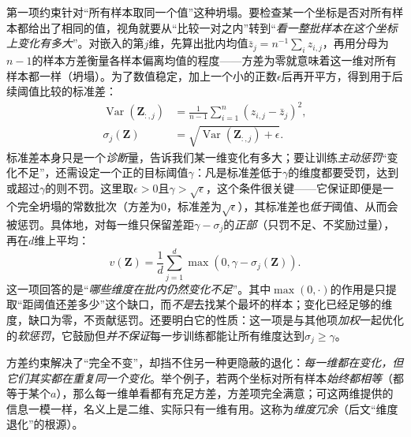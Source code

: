 第一项约束针对“所有样本取同一个值”这种坍塌。要检查某一个坐标是否对所有样本都给出了相同的值，视角就要从“比较一对之内”转到“\emph{看一整批样本在这个坐标上变化有多大}”。对嵌入的第$j$维，先算出批内均值$\bar z_j=n^{-1}\sum_i z_{i,j}$，再用分母为$n-1$的样本方差衡量各样本偏离均值的程度——方差为零就意味着这一维对所有样本都一样（坍塌）。为了数值稳定，加上一个小的正数$\epsilon$后再开平方，得到用于后续阈值比较的标准差：
\[
  \begin{aligned}
    \operatorname{Var}(\bm{Z}_{:,j})
    &=\frac{1}{n-1}\sum_{i=1}^{n}(z_{i,j}-\bar z_j)^2,\\
    \sigma_j(\bm{Z})
    &=\sqrt{\operatorname{Var}(\bm{Z}_{:,j})+\epsilon}.
  \end{aligned}
\]
标准差本身只是一个\emph{诊断}量，告诉我们某一维变化有多大；要让训练\emph{主动惩罚}“变化不足”，还需设定一个正的目标阈值$\gamma$：凡是标准差低于$\gamma$的维度都要受罚，达到或超过$\gamma$的则不罚。这里取$\epsilon>0$且$\gamma>\sqrt{\epsilon}$，这个条件很关键——它保证即便是一个完全坍塌的常数批次（方差为0，标准差为$\sqrt{\epsilon}$），其标准差也\emph{低于}阈值、从而会被惩罚。具体地，对每一维只保留差距$\gamma-\sigma_j$的\emph{正部}（只罚不足、不奖励过量），再在$d$维上平均：
\begin{equation}
  v(\bm{Z})
  =\frac{1}{d}\sum_{j=1}^{d}\max(0,\gamma-\sigma_j(\bm{Z})).
  \label{eq:data-derived-knowledge-vicreg-variance}
\end{equation}
这一项回答的是“\emph{哪些维度在批内仍然变化不足}”。其中$\max(0,\cdot)$的作用是只提取“距阈值还差多少”这个缺口，而\emph{不是}去找某个最坏的样本；变化已经足够的维度，缺口为零，不贡献惩罚。还要明白它的性质：这一项是与其他项\emph{加权}一起优化的\emph{软惩罚}，它鼓励但\emph{并不保证}每一步训练都能让所有维度达到$\sigma_j\geq\gamma$。

方差约束解决了“完全不变”，却挡不住另一种更隐蔽的退化：\emph{每一维都在变化，但它们其实都在重复同一个变化}。举个例子，若两个坐标对所有样本\emph{始终都相等}（都等于某个$a$），那么每一维单看都有充足方差，方差项完全满意；可这两维提供的信息一模一样，名义上是二维、实际只有一维有用。这称为\emph{维度冗余}（后文“维度退化”的根源）。

